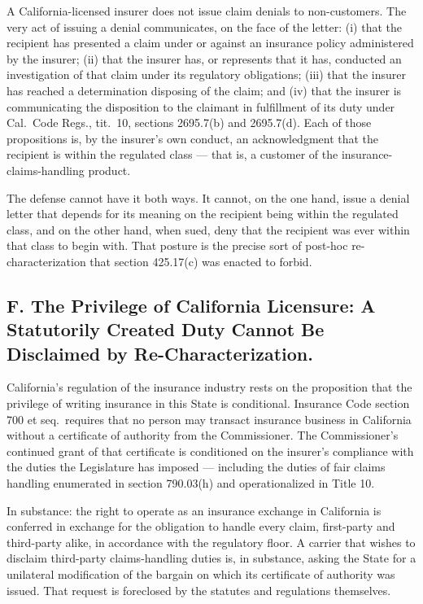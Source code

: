 A California-licensed insurer does not issue claim denials to non-customers. The very act of issuing a denial communicates, on the face of the letter: (i) that the recipient has presented a claim under or against an insurance policy administered by the insurer; (ii) that the insurer has, or represents that it has, conducted an investigation of that claim under its regulatory obligations; (iii) that the insurer has reached a determination disposing of the claim; and (iv) that the insurer is communicating the disposition to the claimant in fulfillment of its duty under Cal.\ Code Regs., tit.\ 10, sections 2695.7(b) and 2695.7(d). Each of those propositions is, by the insurer's own conduct, an acknowledgment that the recipient is within the regulated class --- that is, a customer of the insurance-claims-handling product.

The defense cannot have it both ways. It cannot, on the one hand, issue a denial letter that depends for its meaning on the recipient being within the regulated class, and on the other hand, when sued, deny that the recipient was ever within that class to begin with. That posture is the precise sort of post-hoc re-characterization that section 425.17(c) was enacted to forbid.

\subsection*{F. The Privilege of California Licensure: A Statutorily Created Duty Cannot Be Disclaimed by Re-Characterization.}

California's regulation of the insurance industry rests on the proposition that the privilege of writing insurance in this State is conditional. Insurance Code section 700 et seq.\ requires that no person may transact insurance business in California without a certificate of authority from the Commissioner. The Commissioner's continued grant of that certificate is conditioned on the insurer's compliance with the duties the Legislature has imposed --- including the duties of fair claims handling enumerated in section 790.03(h) and operationalized in Title 10.

In substance: the right to operate as an insurance exchange in California is conferred in exchange for the obligation to handle every claim, first-party and third-party alike, in accordance with the regulatory floor. A carrier that wishes to disclaim third-party claims-handling duties is, in substance, asking the State for a unilateral modification of the bargain on which its certificate of authority was issued. That request is foreclosed by the statutes and regulations themselves.


